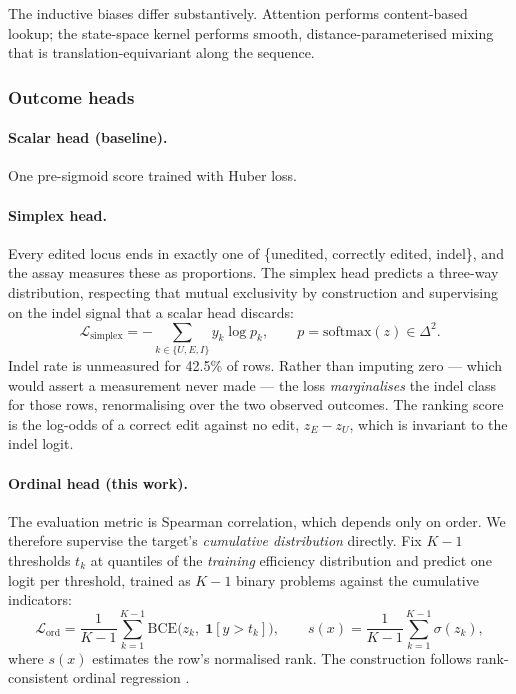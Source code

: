 \documentclass[11pt]{article}
\begin{document}
The inductive biases differ substantively. Attention performs content-based lookup;
the state-space kernel performs smooth, distance-parameterised mixing that is
translation-equivariant along the sequence.

\subsubsection{Outcome heads}
\label{sec:heads}

\paragraph{Scalar head (baseline).} One pre-sigmoid score trained with Huber loss.

\paragraph{Simplex head.} Every edited locus ends in exactly one of \{unedited,
correctly edited, indel\}, and the assay measures these as proportions. The simplex
head predicts a three-way distribution, respecting that mutual exclusivity by
construction and supervising on the indel signal that a scalar head discards:
\begin{equation}
\mathcal{L}_{\text{simplex}} = -\sum_{k\in\{U,E,I\}} y_k \log p_k ,
\qquad p=\mathrm{softmax}(z)\in\Delta^2 .
\end{equation}
Indel rate is unmeasured for 42.5\% of rows. Rather than imputing zero --- which would
assert a measurement never made --- the loss \emph{marginalises} the indel class for
those rows, renormalising over the two observed outcomes. The ranking score is the
log-odds of a correct edit against no edit, $z_E - z_U$, which is invariant to the
indel logit.

\paragraph{Ordinal head (this work).} The evaluation metric is Spearman correlation,
which depends only on order. We therefore supervise the target's \emph{cumulative
distribution} directly. Fix $K-1$ thresholds $t_k$ at quantiles of the \emph{training}
efficiency distribution and predict one logit per threshold, trained as $K-1$ binary
problems against the cumulative indicators:
\begin{equation}
\mathcal{L}_{\text{ord}}
= \frac{1}{K-1}\sum_{k=1}^{K-1}
\mathrm{BCE}\bigl(z_k,\; \mathbf{1}[y > t_k]\bigr),
\qquad
s(x) = \frac{1}{K-1}\sum_{k=1}^{K-1}\sigma(z_k),
\label{eq:ordinal}
\end{equation}
where $s(x)$ estimates the row's normalised rank. The construction follows
rank-consistent ordinal regression \citep{cao2020}.
\end{document}
